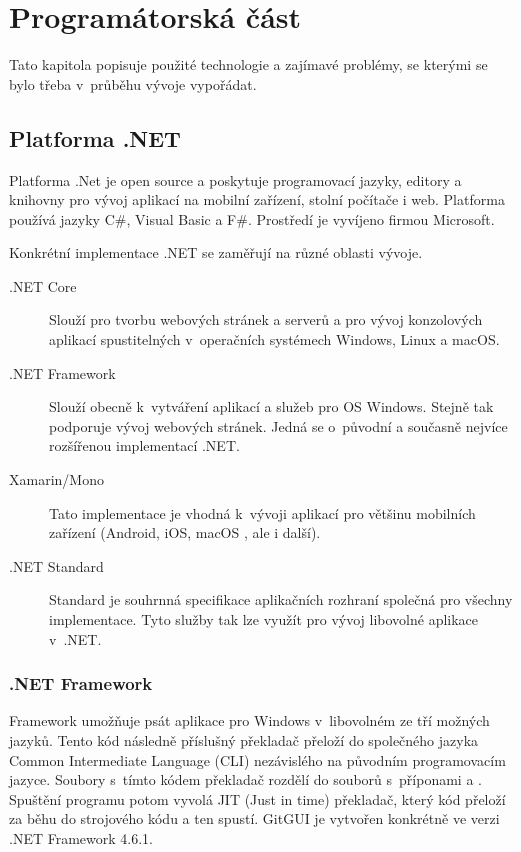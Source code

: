 \documentclass[
  biblatex,
  glossaries,
  index
]{kidiplom}
\begin{document}
\section{Programátorská část}
Tato kapitola popisuje použité technologie a zajímavé problémy, se kterými se bylo třeba v~průběhu vývoje vypořádat.

\subsection{Platforma .NET}
Platforma .Net je open source a poskytuje programovací jazyky, editory a knihovny pro vývoj aplikací na mobilní zařízení, stolní počítače i web. Platforma používá jazyky C\#, Visual Basic a F\#. Prostředí je vyvíjeno firmou Microsoft.

Konkrétní implementace .NET se zaměřují na různé oblasti vývoje.

\begin{description}
\item[.NET Core] Slouží pro tvorbu webových stránek a serverů a pro vývoj konzolových aplikací spustitelných v~operačních systémech Windows, Linux a macOS.

\item[.NET Framework] Slouží obecně k~vytváření aplikací a služeb pro OS Windows. Stejně tak podporuje vývoj webových stránek. Jedná se o~původní a současně nejvíce rozšířenou implementací .NET.

\item[Xamarin/Mono] Tato implementace je vhodná k~vývoji aplikací pro většinu mobilních zařízení (Android, iOS, macOS , ale i další).

\item[.NET Standard] Standard je souhrnná specifikace aplikačních rozhraní společná pro všechny implementace. Tyto služby tak lze využít pro vývoj libovolné aplikace v~.NET.
\end{description}

\subsubsection{.NET Framework}
Framework umožňuje psát aplikace pro Windows v~libovolném ze tří možných jazyků. Tento kód následně příslušný překladač přeloží do společného jazyka Common Intermediate Language (CLI) nezávislého na původním programovacím jazyce. Soubory s~tímto kódem překladač rozdělí do souborů s~příponami  a . Spuštění programu potom vyvolá JIT (Just in time) překladač, který kód přeloží za běhu do strojového kódu a ten spustí. GitGUI je vytvořen konkrétně ve verzi .NET Framework 4.6.1.
\end{document}
